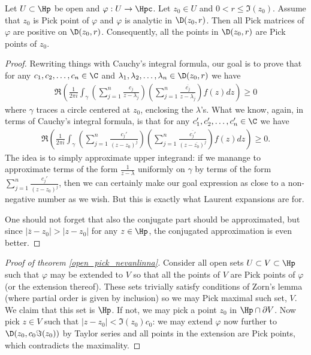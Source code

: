 \begin{lem}\label{pick_point_lemma}
	Let $U \subset \Hp$ be open and $\varphi : U \to \Hpc$. Let $z_{0} \in U$ and $0 < r \leq \Im(z_{0})$. Assume that $z_{0}$ is Pick point of $\varphi$ and $\varphi$ is analytic in $\D(z_{0}, r)$. Then all Pick matrices of $\varphi$ are positive on $\D(z_{0}, r)$. Consequently, all the points in $\D(z_{0}, r)$ are Pick points of $z_{0}$.
\end{lem}
\begin{proof}
	Rewriting things with Cauchy's integral formula, our goal is to prove that for any $c_{1}, c_{2}, \ldots, c_{n} \in \C$ and $\lambda_{1}, \lambda_{2}, \ldots, \lambda_{n} \in \D(z_{0}, r)$ we have
	\begin{align*}
		\Re\left(\frac{1}{2 \pi i} \int_{\gamma} \left(\sum_{j = 1}^{n} \frac{c_{j}}{z - \lambda_{j}}\right)\left(\sum_{j = 1}^{n} \frac{\overline{c_{j}}}{z - \overline{\lambda_{j}}}\right) f(z) dz \right) \geq 0
	\end{align*}
	where $\gamma$ traces a circle centered at $z_{0}$, enclosing the $\lambda$'s. What we know, again, in terms of Cauchy's integral formula, is that for any $c_{1}', c_{2}', \ldots, c_{n}' \in \C$ we have
	\begin{align*}
		\Re\left(\frac{1}{2 \pi i} \int_{\gamma} \left(\sum_{j = 1}^{n} \frac{c_{j}'}{(z - z_{0})^{j}}\right) \left(\sum_{j = 1}^{n}\frac{\overline{c_{j}'}}{(z - \overline{z_{0}})^{j}}\right) f(z) dz\right) \geq 0.
	\end{align*}
	The idea is to simply approximate upper integrand: if we manange to approximate terms of the form $\frac{1}{z - \lambda}$ uniformly on $\gamma$ by terms of the form $\sum_{j = 1}^{n} \frac{c_{j}'}{(z - z_{0})^{j}}$, then we can certainly make our goal expression as close to a non-negative number as we wish. But this is exactly what Laurent expansions are for.

	One should not forget that also the conjugate part should be approximated, but since $|\overline{z} - z_{0}| > |z - z_{0}|$ for any $z \in \Hp$, the conjugated approximation is even better.
\end{proof}

\begin{proof}[Proof of theorem \ref{open_pick_nevanlinna}]
	Consider all open sets $U \subset V \subset \Hp$ such that $\varphi$ may be extended to $V$ so that all the points of $V$ are Pick points of $\varphi$ (or the extension thereof). These sets trivially satisfy conditions of Zorn's lemma (where partial order is given by inclusion) so we may Pick maximal such set, $V$. We claim that this set is $\Hp$. If not, we may pick a point $z_{0}$ in $\Hp \cap \partial V$. Now pick $z \in V$ such that $|z - z_{0}| < \Im(z_{0}) c_{0}$: we may extend $\varphi$ now further to $\D(z_{0}, c_{0} \Im(z_{0}))$ by Taylor series and all points in the extension are Pick points, which contradicts the maximality.
\end{proof}

